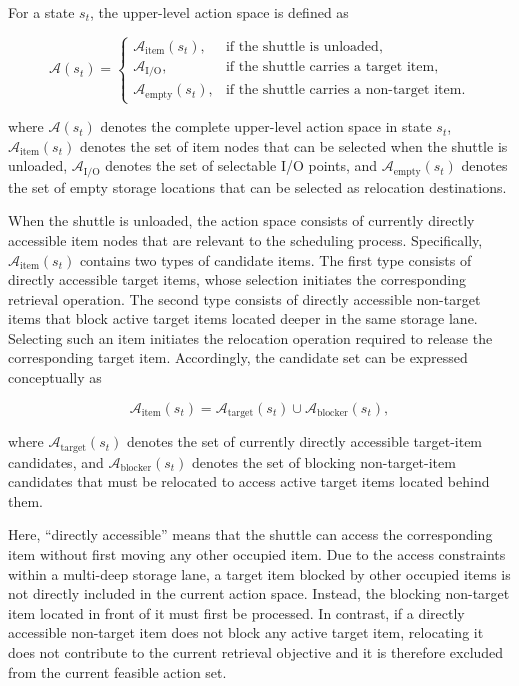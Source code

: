 For a state $s_t$, the upper-level action space is defined as

\[
\mathcal{A}(s_t)=
\begin{cases}
\mathcal{A}_{\mathrm{item}}(s_t), & \text{if the shuttle is unloaded},\\
\mathcal{A}_{\mathrm{I/O}}, & \text{if the shuttle carries a target item},\\
\mathcal{A}_{\mathrm{empty}}(s_t), & \text{if the shuttle carries a non-target item}.
\end{cases}
\]

where $\mathcal{A}(s_t)$ denotes the complete upper-level action space in state $s_t$, $\mathcal{A}_{\mathrm{item}}(s_t)$ denotes the set of item nodes that can be selected when the shuttle is unloaded, $\mathcal{A}_{\mathrm{I/O}}$ denotes the set of selectable I/O points, and $\mathcal{A}_{\mathrm{empty}}(s_t)$ denotes the set of empty storage locations that can be selected as relocation destinations.

When the shuttle is unloaded, the action space consists of currently directly accessible item nodes that are relevant to the scheduling process. Specifically, $\mathcal{A}_{\mathrm{item}}(s_t)$ contains two types of candidate items. The first type consists of directly accessible target items, whose selection initiates the corresponding retrieval operation. The second type consists of directly accessible non-target items that block active target items located deeper in the same storage lane. Selecting such an item initiates the relocation operation required to release the corresponding target item. Accordingly, the candidate set can be expressed conceptually as

\[
\mathcal{A}_{\mathrm{item}}(s_t)
=
\mathcal{A}_{\mathrm{target}}(s_t)
\cup
\mathcal{A}_{\mathrm{blocker}}(s_t),
\]

where $\mathcal{A}_{\mathrm{target}}(s_t)$ denotes the set of currently directly accessible target-item candidates, and $\mathcal{A}_{\mathrm{blocker}}(s_t)$ denotes the set of blocking non-target-item candidates that must be relocated to access active target items located behind them.

Here, ``directly accessible'' means that the shuttle can access the corresponding item without first moving any other occupied item. Due to the access constraints within a multi-deep storage lane, a target item blocked by other occupied items is not directly included in the current action space. Instead, the blocking non-target item located in front of it must first be processed. In contrast, if a directly accessible non-target item does not block any active target item, relocating it does not contribute to the current retrieval objective and it is therefore excluded from the current feasible action set.

